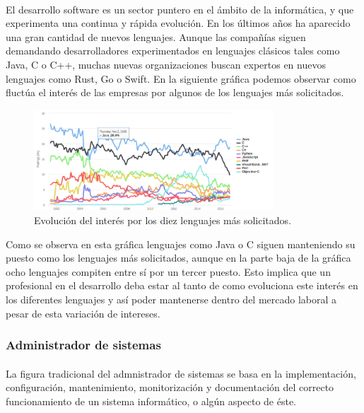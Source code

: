 \documentclass[12pt, a4paper]{report}
\begin{document}
                \paragraph{}
                El desarrollo software es un sector puntero en el ámbito de la informática, y que experimenta una continua y rápida evolución. En los últimos años ha aparecido una gran cantidad de nuevos lenguajes. Aunque las compañías siguen demandando desarrolladores experimentados en lenguajes clásicos tales como Java, C o C++, muchas nuevas organizaciones buscan expertos en nuevos lenguajes como Rust, Go o Swift. En la siguiente gráfica podemos observar como fluctúa el interés de las empresas por algunos de los lenguajes más solicitados.
                
                \begin{figure}[htb]
				\centering
				\includegraphics[width=0.8\textwidth]						{images/evolucion_lenguajes}
				\caption{Evolución del interés por los diez lenguajes más solicitados.\cite{tiobe-index}} 		
                \label{fig:leng-evol}
			\end{figure}
            
            Como se observa en esta gráfica lenguajes como Java o C siguen manteniendo su puesto como los lenguajes más solicitados, aunque en la parte baja de la gráfica ocho lenguajes compiten entre sí por un tercer puesto. Esto implica que un profesional en el desarrollo deba estar al tanto de como evoluciona este interés en los diferentes lenguajes y así poder mantenerse dentro del mercado laboral a pesar de esta variación de intereses.
            
    		\subsubsection{Administrador de sistemas}
        		\paragraph{}
                La figura tradicional del admnistrador de sistemas se basa en la implementación, configuración, mantenimiento, monitorización y documentación del correcto funcionamiento de un sistema informático, o algún aspecto de éste. \cite{wikipedia:sysadmin} 
                
\end{document}
